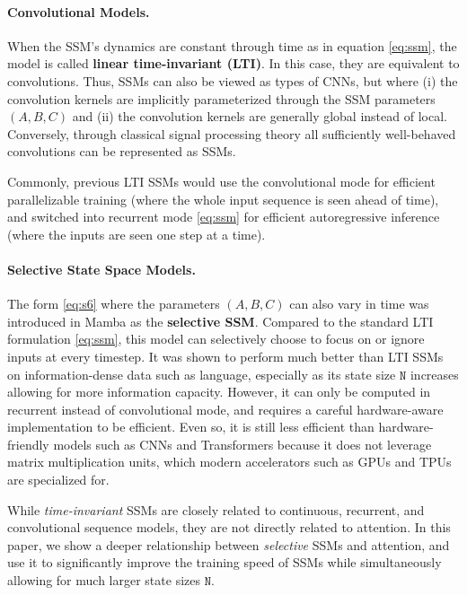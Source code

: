\paragraph{Convolutional Models.} When the SSM's dynamics are constant through time as in equation \eqref{eq:ssm}, the model is called \textbf{linear time-invariant (LTI)}. In this case, they are equivalent to convolutions. Thus, SSMs can also be viewed as types of CNNs, but where (i) the convolution kernels are implicitly parameterized through the SSM parameters $(A, B, C)$ and (ii) the convolution kernels are generally global instead of local. Conversely, through classical signal processing theory all sufficiently well-behaved convolutions can be represented as SSMs.

Commonly, previous LTI SSMs would use the convolutional mode for efficient parallelizable training (where the whole input sequence is seen ahead of time), and switched into recurrent mode \eqref{eq:ssm} for efficient autoregressive inference (where the inputs are seen one step at a time).

\paragraph{Selective State Space Models.} The form \eqref{eq:s6} where the parameters $(A, B, C)$ can also vary in time was introduced in Mamba as the \textbf{selective SSM}. Compared to the standard LTI formulation \eqref{eq:ssm}, this model can selectively choose to focus on or ignore inputs at every timestep. It was shown to perform much better than LTI SSMs on information-dense data such as language, especially as its state size $\mathtt{N}$ increases allowing for more information capacity. However, it can only be computed in recurrent instead of convolutional mode, and requires a careful hardware-aware implementation to be efficient. Even so, it is still less efficient than hardware-friendly models such as CNNs and Transformers because it does not leverage matrix multiplication units, which modern accelerators such as GPUs and TPUs are specialized for.

While \emph{time-invariant} SSMs are closely related to continuous, recurrent, and convolutional sequence models, they are not directly related to attention. In this paper, we show a deeper relationship between \emph{selective} SSMs and attention, and use it to significantly improve the training speed of SSMs while simultaneously allowing for much larger state sizes $\mathtt{N}$.

